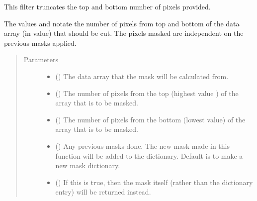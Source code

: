 \documentclass[letterpaper,10pt,english]{sphinxmanual}
\begin{document}
\begin{fulllineitems}
\label{\detokenize{python_docstrings/IfA_Smeargle.echo.masks.masks_echo200:IfA_Smeargle.echo.masks.masks_echo200.echo275_pixel_truncation}}
This filter truncates the top and bottom number of pixels provided.

The values  and  notate the number of pixels
from top and bottom of the data array  (in value) that should be cut.
The pixels masked are independent on the previous masks applied.
\begin{quote}\begin{description}
\item[{Parameters}] \leavevmode\begin{itemize}
\item {} 
 () \textendash{} The data array that the mask will be calculated from.

\item {} 
 () \textendash{} The number of pixels from the top (highest value ) of the array
that is to be masked.

\item {} 
 () \textendash{} The number of pixels from the bottom (lowest value) of the array that
is to be masked.

\item {} 
 (\sphinxstyleliteralemphasis{\sphinxupquote{ (}}\sphinxstyleliteralemphasis{\sphinxupquote{)}}) \textendash{} Any previous masks done. The new mask made in this function will be
added to the dictionary. Default is to make a new mask dictionary.

\item {} 
 (\sphinxstyleliteralemphasis{\sphinxupquote{ (}}\sphinxstyleliteralemphasis{\sphinxupquote{)}}) \textendash{} If this is true, then the mask itself (rather than the dictionary
entry) will be returned instead.


\end{itemize}
\end{description}
\end{quote}
\end{fulllineitems}
\end{document}
